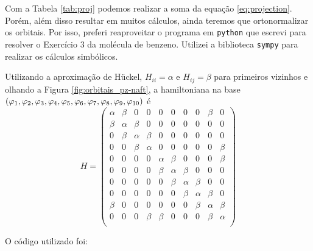 \documentclass[a4paper,10pt]{article}
\newcommand{\python}[1]{\texttt{#1}}
\begin{document}
Com a Tabela \ref{tab:proj} podemos realizar a soma da equação \ref{eq:projection}. Porém, além disso resultar em muitos cálculos, ainda teremos que ortonormalizar os orbitais. Por isso, preferi reaproveitar o programa em \python{python} que escrevi para resolver o Exercício 3 da molécula de benzeno. Utilizei a biblioteca \python{sympy} para realizar os cálculos simbólicos.

\n

Utilizando a aproximação de Hückel, $H_{ii} = \alpha$ e $H_{ij} = \beta$ para primeiros vizinhos e olhando a Figura \ref{fig:orbitais_pz-naft}, a hamiltoniana na base $(\varphi_1, \varphi_2, \varphi_3, \varphi_4, \varphi_5, \varphi_6, \varphi_7, \varphi_8, \varphi_9, \varphi_{10})$ é
$$
H=
\begin{pmatrix}
\alpha & \beta & 0 & 0 & 0 & 0 & 0 & 0 & \beta & 0 \\
\beta & \alpha & \beta & 0 & 0 & 0 & 0 & 0 & 0 & 0 \\
0 & \beta & \alpha & \beta & 0 & 0 & 0 & 0 & 0 & 0 \\
0 & 0 & \beta & \alpha & 0 & 0 & 0 & 0 & 0 & \beta \\
0 & 0 & 0 & 0 & \alpha & \beta & 0 & 0 & 0 & \beta \\
0 & 0 & 0 & 0 & \beta & \alpha & \beta & 0 & 0 & 0 \\
0 & 0 & 0 & 0 & 0 & \beta & \alpha & \beta & 0 & 0 \\
0 & 0 & 0 & 0 & 0 & 0 & \beta & \alpha & \beta & 0 \\
\beta & 0 & 0 & 0 & 0 & 0 & 0 & \beta & \alpha & \beta \\
0 & 0 & 0 & \beta & \beta & 0 & 0 & 0 & \beta & \alpha \\
\end{pmatrix}
$$

O código utilizado foi:
\end{document}
